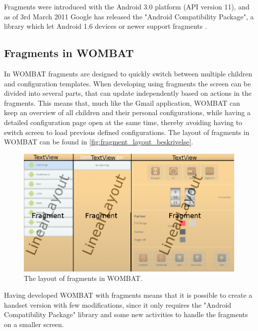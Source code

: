 Fragments were introduced with the Android 3.0 platform (API version 11), and as of 3rd March 2011 Google has released the "Android Compatibility Package", a library which let Android 1.6 devices or newer support fragments \cite{web:android:fragments:support}.
 
\subsection{Fragments in WOMBAT}
In WOMBAT fragments are designed to quickly switch between multiple children and configuration templates. When developing using fragments the screen can be divided into several parts, that can update independently based on actions in the fragments.
This means that, much like the Gmail application, WOMBAT can keep an overview of all children and their personal configurations, while having a detailed configuration page open at the same time, thereby avoiding having to switch screen to load previous defined configurations. The layout of fragments in WOMBAT can be found in \autoref{fig:fragment_layout_beskrivelse}.\\

\begin{figure}[H]
	\centering
		\includegraphics[width=\textwidth]{Images/Implementation/fragment_layout_beskrivelse.png}
	\caption{The layout of fragments in WOMBAT.}
	\label{fig:fragment_layout_beskrivelse}
\end{figure}

Having developed WOMBAT with fragments means that it is possible to create a handset version with few modifications, since it only requires the "Android Compatibility Package" library and some new activities to handle the fragments on a smaller screen.